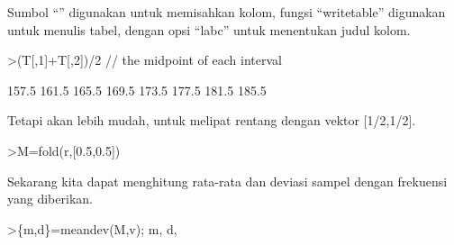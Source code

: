 \documentclass[a4paper,10pt]{article}
\begin{document}
\begin{eulernotebook}
\begin{eulercomment}
\begin{eulercomment}
\begin{eulercomment}
\begin{eulercomment}
\begin{eulercomment}
\begin{eulercomment}
\begin{eulercomment}
\begin{eulercomment}
\begin{eulercomment}
\begin{eulercomment}
\begin{eulercomment}
\begin{eulercomment}
\begin{eulercomment}
\begin{eulercomment}
\begin{eulercomment}
\begin{eulercomment}
\begin{eulercomment}
\begin{eulercomment}
\begin{eulercomment}
\begin{eulercomment}
\begin{eulercomment}
\begin{eulercomment}
\begin{eulercomment}
\begin{eulercomment}
\begin{eulercomment}
\begin{eulercomment}
\begin{eulercomment}
\begin{eulercomment}
\begin{eulercomment}
\begin{eulercomment}
\begin{eulercomment}
\begin{eulercomment}
\begin{eulercomment}
\begin{eulercomment}
\begin{eulercomment}
\begin{eulercomment}
\begin{eulercomment}
\begin{eulercomment}
\begin{eulercomment}
\begin{eulercomment}
\begin{eulercomment}
\begin{eulercomment}
\begin{eulercomment}
\begin{eulercomment}
\begin{eulercomment}
Sumbol “\textbar{}” digunakan untuk memisahkan kolom, fungsi “writetable”
digunakan untuk menulis tabel, dengan opsi “labc” untuk menentukan
judul kolom.
\end{eulercomment}
\begin{eulerprompt}
>(T[,1]+T[,2])/2 // the midpoint of each interval
\end{eulerprompt}
\begin{euleroutput}
          157.5 
          161.5 
          165.5 
          169.5 
          173.5 
          177.5 
          181.5 
          185.5 
\end{euleroutput}
\begin{eulercomment}
Tetapi akan lebih mudah, untuk melipat rentang dengan vektor
[1/2,1/2].
\end{eulercomment}
\begin{eulerprompt}
>M=fold(r,[0.5,0.5])
\end{eulerprompt}
\begin{euleroutput}
  [157.5,  161.5,  165.5,  169.5,  173.5,  177.5,  181.5,  185.5]
\end{euleroutput}
\begin{eulercomment}
Sekarang kita dapat menghitung rata-rata dan deviasi sampel dengan
frekuensi yang diberikan.
\end{eulercomment}
\begin{eulerprompt}
>\{m,d\}=meandev(M,v); m, d,
\end{eulerprompt}

\end{eulercomment}
\end{eulercomment}
\end{eulercomment}
\end{eulercomment}
\end{eulercomment}
\end{eulercomment}
\end{eulercomment}
\end{eulercomment}
\end{eulercomment}
\end{eulercomment}
\end{eulercomment}
\end{eulercomment}
\end{eulercomment}
\end{eulercomment}
\end{eulercomment}
\end{eulercomment}
\end{eulercomment}
\end{eulercomment}
\end{eulercomment}
\end{eulercomment}
\end{eulercomment}
\end{eulercomment}
\end{eulercomment}
\end{eulercomment}
\end{eulercomment}
\end{eulercomment}
\end{eulercomment}
\end{eulercomment}
\end{eulercomment}
\end{eulercomment}
\end{eulercomment}
\end{eulercomment}
\end{eulercomment}
\end{eulercomment}
\end{eulercomment}
\end{eulercomment}
\end{eulercomment}
\end{eulercomment}
\end{eulercomment}
\end{eulercomment}
\end{eulercomment}
\end{eulercomment}
\end{eulercomment}
\end{eulercomment}
\end{eulernotebook}
\end{document}
